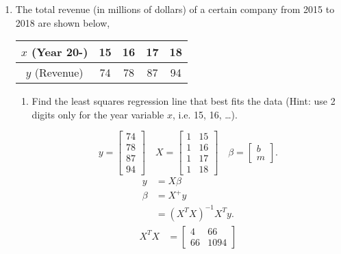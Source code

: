 \documentclass{zc-ust-hw}
\begin{document}
\begin{enumerate}
    \newpage
    
  \item The total revenue (in millions of dollars) of a certain company from
    2015 to 2018 are shown below, 
    \begin{table}[H]
      \begin{center}
        \begin{tabular}{|c|c|c|c|c|}
          \hline
          $x$ (Year 20-) & 15 & 16 & 17 & 18 \\
          \hline
          $y$ (Revenue) & 74 & 78 & 87 & 94 \\
          \hline
        \end{tabular}
      \end{center}
    \end{table}
    \begin{enumerate}
      \item Find the least squares regression line that best fits the data
        (Hint: use 2 digits only for the year variable \(x\), i.e. 15, 16, \dots). 
        \begin{sol}
          \begin{equation}
            y = \begin{bmatrix} 74\\78\\87\\94 \end{bmatrix} 
            \quad
            X = \begin{bmatrix} 1 & 15 \\ 1 & 16 \\ 1 & 17 \\ 1 & 18 \end{bmatrix}
            \quad
            \beta = \begin{bmatrix} b \\ m \end{bmatrix}
          .\end{equation}
          \begin{align}
            y &= X\beta \\
            \beta &= X^+y \\
            &= (X^TX)^{-1}X^Ty
          .\end{align}
          \begin{align}
            X^TX &= \begin{bmatrix} 4 & 66 \\ 66 & 1094 \end{bmatrix} \\

\end{align}
\end{sol}
\end{enumerate}
\end{enumerate}
\end{document}
